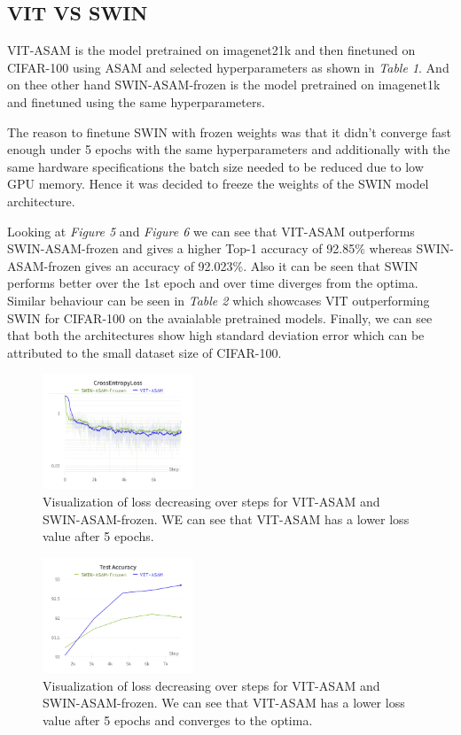 \documentclass{article}
\begin{document}
\subsection{VIT VS SWIN}
VIT-ASAM is the model pretrained on imagenet21k and then finetuned on CIFAR-100 using ASAM and selected hyperparameters as shown in \textit{Table 1}.
And on thee other hand SWIN-ASAM-frozen is the model pretrained on imagenet1k and finetuned using the same hyperparameters.

The reason to finetune SWIN with frozen weights was that it didn't converge fast enough under 5 epochs with the same hyperparameters and additionally with the same hardware specifications the batch size needed to be reduced due to low GPU memory.
Hence it was decided to freeze the weights of the SWIN model architecture.

Looking at \textit{Figure 5} and \textit{Figure 6} we can see that VIT-ASAM outperforms SWIN-ASAM-frozen and gives a higher Top-1 accuracy of 92.85\% whereas SWIN-ASAM-frozen gives an accuracy of 92.023\%.
Also it can be seen that SWIN performs better over the 1st epoch and over time diverges from the optima.
Similar behaviour can be seen in \textit{Table 2} which showcases VIT outperforming SWIN for CIFAR-100 on the avaialable pretrained models.
Finally, we can see that both the architectures show high standard deviation error which can be attributed to the small dataset size of CIFAR-100.

\begin{figure}[ht]
    \vskip 0.2in
    \centering
    \includegraphics[width=0.4\textwidth]{cross_entropy_loss.png}
    \caption{Visualization of loss decreasing over steps for VIT-ASAM and SWIN-ASAM-frozen. WE can see that VIT-ASAM has a lower loss value after 5 epochs.}
    \label{fig:foobar}
    \vskip -0.2in
\end{figure}

\begin{figure}[ht]
    \vskip 0.2in
    \centering
    \includegraphics[width=0.4\textwidth]{test_accuracy.png}
    \caption{Visualization of loss decreasing over steps for VIT-ASAM and SWIN-ASAM-frozen. We can see that VIT-ASAM has a lower loss value after 5 epochs and converges to the optima.}
    \label{fig:foobar}
    \vskip -0.2in
\end{figure}
\end{document}
